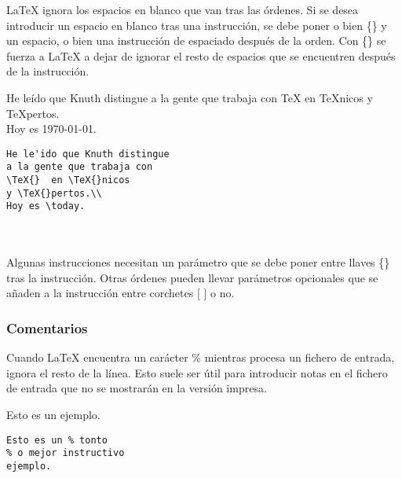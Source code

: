 				\LaTeX{} ignora los espacios en blanco que van tras las \'ordenes. Si se desea introducir un espacio en blanco 
				tras una instrucci\'on, se debe poner o bien \{\} y un espacio, o bien una instrucci\'on de espaciado despu\'es 
				de la orden. Con \{\} se fuerza a \LaTeX{} a dejar de ignorar el resto de espacios que se encuentren despu\'es 
				de la instrucci\'on.\\
				
\begin{minipage}{0,4\linewidth}
He le\'ido que Knuth distingue 
a la gente que trabaja con 
\TeX{} en \TeX{}nicos y \TeX{}pertos.\\
Hoy es \today.
\end{minipage}
\hfill\begin{minipage}{0,5\linewidth}
\begin{verbatim}
He le'ido que Knuth distingue 
a la gente que trabaja con 
\TeX{}  en \TeX{}nicos 
y \TeX{}pertos.\\
Hoy es \today.
\end{verbatim}
\end{minipage}\\
\\

				Algunas instrucciones necesitan un par\'ametro que se debe poner entre llaves \{\} tras la instrucci\'on. Otras 
				\'ordenes pueden llevar par\'ametros opcionales que se a\~naden a la instrucci\'on entre corchetes [ ] o no. 


				\subsubsection{Comentarios}
				Cuando \LaTeX{} encuentra un car\'acter \% mientras procesa un fichero de entrada, ignora el resto de la 
				l\'inea. Esto suele ser \'util para introducir notas en el fichero de entrada que no se mostrar\'an en la 
				versi\'on impresa.\\

\begin{minipage}{0,4\linewidth}
Esto es un %
ejemplo.
\end{minipage}
\hfill\begin{minipage}{0,5\linewidth}
\begin{verbatim}
Esto es un % tonto 
% o mejor instructivo
ejemplo.
\end{verbatim}
\end{minipage}\\
\\

